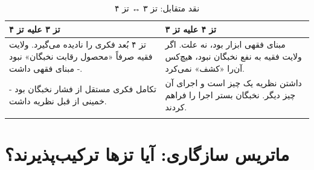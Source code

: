 \documentclass[12pt,a4paper]{book}
\begin{document}
\begin{longtable}{%
    >{\raggedleft\arraybackslash}p{}
    >{\raggedleft\arraybackslash}p{}}
\toprule
\rowcolor{cGold!10}
\textbf{تز ۳ علیه تز ۴} &
\rowcolor{cConsolid!8}
\textbf{تز ۴ علیه تز ۳} \\
\midrule

تز ۴ بُعد فکری را نادیده می‌گیرد. ولایت فقیه صرفاً «محصول رقابت نخبگان» نبود - مبنای فقهی داشت. &
مبنای فقهی ابزار بود، نه علت. اگر ولایت فقیه به نفع نخبگان نبود، هیچ‌کس آن‌را «کشف» نمی‌کرد. \\
\midrule

تکامل فکری مستقل از فشار نخبگان بود - خمینی از قبل نظریه داشت. &
داشتن نظریه یک چیز است و اجرای آن چیز دیگر. نخبگان بستر اجرا را فراهم کردند. \\

\bottomrule
\caption{نقد متقابل: تز ۳ ↔ تز ۴}
\end{longtable}

\section{ماتریس سازگاری: آیا تزها ترکیب‌پذیرند؟}
\end{document}
